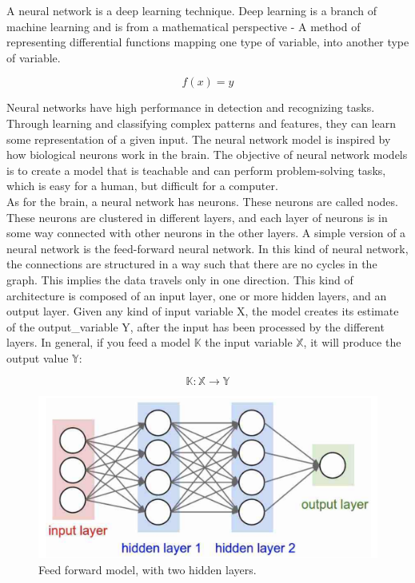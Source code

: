 A neural network is a deep learning technique. Deep learning is a branch of machine learning and is from a mathematical perspective - A method of representing differential functions mapping one type of variable, into another type of variable.

$$
f(x) = y
$$

\noindent
Neural networks have high performance in detection and recognizing tasks. Through learning and classifying complex patterns and features, they can learn some representation of a given input. The neural network model is inspired by how biological neurons work in the brain. The objective of neural network models is to create a model that is teachable and can perform problem-solving tasks, which is easy for a human, but difficult for a computer.\\

\noindent
As for the brain, a neural network has neurons. These neurons are called nodes. These neurons are clustered in different layers, and each layer of neurons is in some way connected with other neurons in the other layers. A simple version of a neural network is the feed-forward neural network. In this kind of neural network, the connections are structured in a way such that there are no cycles in the graph. This implies the data travels only in one direction. This kind of architecture is composed of an input layer, one or more hidden layers, and an output layer. Given any kind of input variable X, the model creates its estimate of the output\_variable Y, after the input has been processed by the different layers.
In general, if you feed a model $\mathbb{K}$ the input variable $\mathbb{X}$, it will produce the output value $\mathbb{Y}:$

$$
\mathbb{K}: \mathbb{X} \to \mathbb{Y}
$$

\begin{figure}[!ht]
  \centering
  \includegraphics[scale=0.4]{latex/imgs/NN.png}
  \caption{Feed forward model, with two hidden layers.}\label{Baseline:before}
\end{figure}

